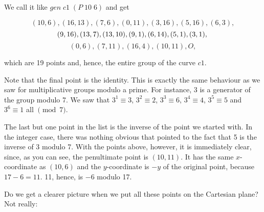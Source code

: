 \documentclass[tikz]{scrreprt}
\newcommand{\Conid}[1]{\mathit{#1}}
\newcommand{\Varid}[1]{\mathit{#1}}
\begin{document}
We call it like \ensuremath{\Varid{gen}\;\Varid{c1}\;(\Conid{P}\;\mathrm{10}\;\mathrm{6})} and get

\[
(10,6),(16,13),(7,6),(0,11),(3,16),(5,16),(6,3),
\]\[
(9,16),(13,7),(13,10),(9,1),(6,14),(5,1),(3,1),\\
\]\[
(0,6),(7,11),(16,4),(10,11),O,
\]

which are 19 points and, hence, the entire group
of the curve $c1$.

Note that the final point is the identity.
This is exactly the same behaviour as we saw
for multiplicative groups modulo a prime.
For instance, 3 is a generator of the group
modulo 7. We saw that 
$3^1 \equiv 3$,
$3^2 \equiv 2$,
$3^3 \equiv 6$,
$3^4 \equiv 4$,
$3^5 \equiv 5$ and
$3^6 \equiv 1$ all $\pmod{7}$.
 
The last but one point in the list is the inverse
of the point we started with. In the integer case,
there was nothing obvious that pointed to the fact
that 5 is the inverse of 3 modulo 7. With the points
above, however, it is immediately clear, since,
as you can see, the penultimate point is $(10,11)$.
It has the same $x$-coordinate as $(10,6)$ and the
$y$-coordinate is $-y$ of the original point, because
$17-6 = 11$. 11, hence, is $-6$ modulo 17.

Do we get a clearer picture when we put all 
these points on the Cartesian plane? Not really:

\begin{center}
\end{center}
\end{document}
